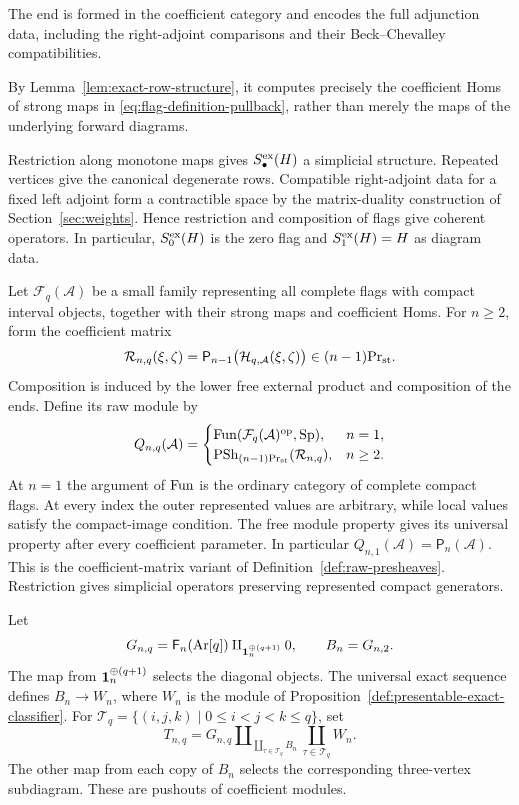 The end is formed in the coefficient category and encodes the full adjunction data, including the right-adjoint comparisons and their Beck--Chevalley compatibilities. 

By Lemma~\ref{lem:exact-row-structure}, it computes precisely the coefficient Homs of strong maps in \eqref{eq:flag-definition-pullback}, rather than merely the maps of the underlying forward diagrams.

Restriction along monotone maps gives $S_\bullet^{\mathrm{ex}}(H)$ a
simplicial structure. Repeated vertices give the canonical degenerate
rows. Compatible right-adjoint data for a fixed left adjoint form a
contractible space by the matrix-duality construction of
Section~\ref{sec:weights}. Hence restriction and composition of flags
give coherent operators. In particular,
$S_0^{\mathrm{ex}}(H)$ is the zero flag and $S_1^{\mathrm{ex}}(H)=H$ as diagram data.

Let $\mathcal F_q(\mathcal A)$ be a small family representing all
complete flags with compact interval objects, together with their
strong maps and coefficient Homs.
For $n\geq2$, form the coefficient matrix
\[
 \mathcal R_{n,q}(\xi,\zeta)
   =\mathsf P_{n-1}
      \bigl(\mathcal H_{q,\mathcal A}(\xi,\zeta)\bigr)
       \in{(n-1)}\mathrm{Pr}_{\mathrm{st}}.
\]
Composition is induced by the lower free external product and
composition of the ends. Define its raw module by
\begin{equation}\label{eq:waldhausen-input-flags}
 Q_{n,q}(\mathcal A)=
 \begin{cases}
 \operatorname{Fun}(\mathcal F_q(\mathcal A)^{\mathrm{op}},\mathrm{Sp}),&n=1,\\
 \operatorname{PSh}_{{(n-1)}\mathrm{Pr}_{\mathrm{st}}}(\mathcal R_{n,q}),&n\geq2.
 \end{cases}
\end{equation}
At $n=1$ the argument of $\operatorname{Fun}$ is the ordinary category of complete
compact flags. At every index the outer represented values are
arbitrary, while local values satisfy the compact-image condition.
The free module property gives its universal property after every
coefficient parameter. In particular $Q_{n,1}(\mathcal A)=
\mathsf P_n(\mathcal A)$. This is the coefficient-matrix variant
of Definition~\ref{def:raw-presheaves}. Restriction gives simplicial
operators preserving represented compact generators.

\begin{definition}\label{def:flag-weights}
Let
\[
 G_{n,q}=\mathsf F_n(\operatorname{Ar}[q])
       \amalg_{\mathbf 1_n^{\oplus(q+1)}}0,
 \qquad B_n=G_{n,2}.
\]
The map from $\mathbf 1_n^{\oplus(q+1)}$ selects the diagonal objects.
The universal exact sequence defines $B_n\to W_n$, where $W_n$ is the
module of Proposition~\ref{def:presentable-exact-classifier}. For
$\mathcal T_q=\{(i,j,k)\mid0\leq i<j<k\leq q\}$, set
\begin{equation}\label{eq:flag-weight-pushout}
 T_{n,q}=
 G_{n,q}
 \amalg_{\displaystyle\coprod_{\tau\in\mathcal T_q}B_n}
             \displaystyle\coprod_{\tau\in\mathcal T_q}W_n.
\end{equation}
The other map from each copy of $B_n$ selects the corresponding
three-vertex subdiagram. These are pushouts of coefficient modules.
\end{definition}

